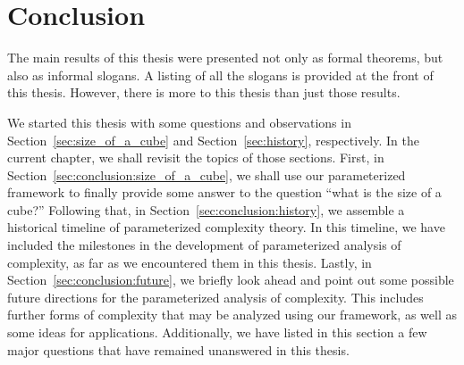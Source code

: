 \chapter{Conclusion}

The main results of this thesis were presented not only as formal theorems, but also as informal slogans.
A listing of all the slogans is provided at the front of this thesis.
However, there is more to this thesis than just those results.

We started this thesis with some questions and observations in Section~\ref{sec:size_of_a_cube} and Section~\ref{sec:history}, respectively.
In the current chapter, we shall revisit the topics of those sections.
First, in Section~\ref{sec:conclusion:size_of_a_cube}, we shall use our parameterized framework to finally provide some answer to the question \enquote{what is the size of a cube?}
Following that, in Section~\ref{sec:conclusion:history}, we assemble a historical timeline of parameterized complexity theory.
In this timeline, we have included the milestones in the development of parameterized analysis of complexity, as far as we encountered them in this thesis.
Lastly, in Section~\ref{sec:conclusion:future}, we briefly look ahead and point out some possible future directions for the parameterized analysis of complexity.
This includes further forms of complexity that may be analyzed using our framework, as well as some ideas for applications.
Additionally, we have listed in this section a few major questions that have remained unanswered in this thesis.


\label{sec:conclusion:size_of_a_cube}%

